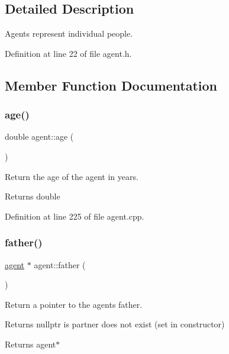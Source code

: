 \subsection{Detailed Description}
Agents represent individual people. 

Definition at line 22 of file agent.\+h.



\subsection{Member Function Documentation}
\mbox{\label{classagent_a1f8475f933cfae0199d73c108faff1ad}} 
\subsubsection{\texorpdfstring{age()}{age()}}
{\footnotesize\ttfamily double agent\+::age (\begin{DoxyParamCaption}{ }\end{DoxyParamCaption})}



Return the age of the agent in years. 

\begin{DoxyReturn}{Returns}
double 
\end{DoxyReturn}


Definition at line 225 of file agent.\+cpp.

\mbox{\label{classagent_a1c29803a7627d786ff50d6f39b81a285}} 
\subsubsection{\texorpdfstring{father()}{father()}}
{\footnotesize\ttfamily \mbox{\hyperlink{classagent}{agent}} $\ast$ agent\+::father (\begin{DoxyParamCaption}{ }\end{DoxyParamCaption})}



Return a pointer to the agent\textquotesingle{}s father. 

Returns nullptr is partner does not exist (set in constructor)

\begin{DoxyReturn}{Returns}
agent$\ast$ 
\end{DoxyReturn}


